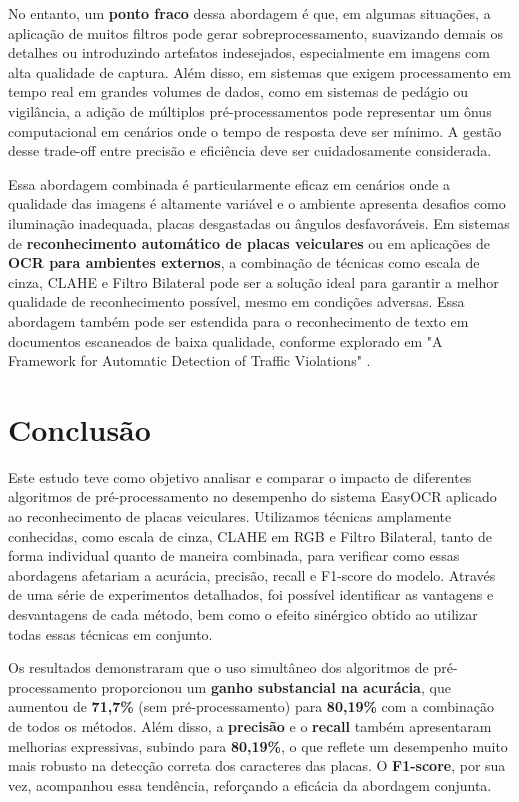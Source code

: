 \documentclass[conference]{IEEEtran}
\begin{document}
No entanto, um \textbf{ponto fraco} dessa abordagem é que, em algumas situações, a aplicação de muitos filtros pode gerar sobreprocessamento, suavizando demais os detalhes ou introduzindo artefatos indesejados, especialmente em imagens com alta qualidade de captura. Além disso, em sistemas que exigem processamento em tempo real em grandes volumes de dados, como em sistemas de pedágio ou vigilância, a adição de múltiplos pré-processamentos pode representar um ônus computacional em cenários onde o tempo de resposta deve ser mínimo. A gestão desse trade-off entre precisão e eficiência deve ser cuidadosamente considerada.

Essa abordagem combinada é particularmente eficaz em cenários onde a qualidade das imagens é altamente variável e o ambiente apresenta desafios como iluminação inadequada, placas desgastadas ou ângulos desfavoráveis. Em sistemas de \textbf{reconhecimento automático de placas veiculares} ou em aplicações de \textbf{OCR para ambientes externos}, a combinação de técnicas como escala de cinza, CLAHE e Filtro Bilateral pode ser a solução ideal para garantir a melhor qualidade de reconhecimento possível, mesmo em condições adversas. Essa abordagem também pode ser estendida para o reconhecimento de texto em documentos escaneados de baixa qualidade, conforme explorado em "A Framework for Automatic Detection of Traffic Violations" \cite{b12}.


\section{Conclusão}

Este estudo teve como objetivo analisar e comparar o impacto de diferentes algoritmos de pré-processamento no desempenho do sistema EasyOCR aplicado ao reconhecimento de placas veiculares. Utilizamos técnicas amplamente conhecidas, como escala de cinza, CLAHE em RGB e Filtro Bilateral, tanto de forma individual quanto de maneira combinada, para verificar como essas abordagens afetariam a acurácia, precisão, recall e F1-score do modelo. Através de uma série de experimentos detalhados, foi possível identificar as vantagens e desvantagens de cada método, bem como o efeito sinérgico obtido ao utilizar todas essas técnicas em conjunto.

Os resultados demonstraram que o uso simultâneo dos algoritmos de pré-processamento proporcionou um \textbf{ganho substancial na acurácia}, que aumentou de \textbf{71,7\%} (sem pré-processamento) para \textbf{80,19\%} com a combinação de todos os métodos. Além disso, a \textbf{precisão} e o \textbf{recall} também apresentaram melhorias expressivas, subindo para \textbf{80,19\%}, o que reflete um desempenho muito mais robusto na detecção correta dos caracteres das placas. O \textbf{F1-score}, por sua vez, acompanhou essa tendência, reforçando a eficácia da abordagem conjunta.
\end{document}
